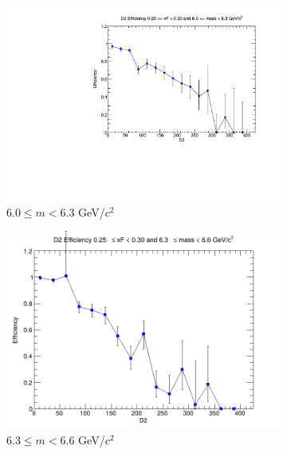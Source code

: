 \begin{figure}[p]
\begin{subfigure}[b]{0.32\textwidth}
        \includegraphics[width=\textwidth]{./kTrackerEfficiencyPlots/D2_Efficiency_xF5_mass6.pdf}
        \caption{$6.0 \leq m < 6.3$ GeV/$c^2$}
        \label{fig:xF5_mass6}
    \end{subfigure}
    \hfill
    \begin{subfigure}[b]{0.32\textwidth}
        \centering
        \includegraphics[width=\textwidth]{./kTrackerEfficiencyPlots/D2_Efficiency_xF5_mass7.png}
        \caption{$6.3 \leq m < 6.6$ GeV/$c^2$}
        \label{fig:xF5_mass7}
    \end{subfigure}
    \hfill
    \begin{subfigure}[b]{0.32\textwidth}
        \centering

\end{subfigure}
\end{figure}
